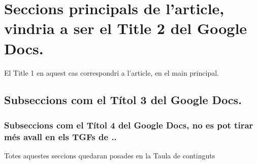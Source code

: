 \section{Seccions principals de l'article, vindria a ser el Title 2 del Google Docs.}
El Title 1 en aquest cas correspondri a l'article,  en el main principal.
\subsection{Subseccions com el Títol 3 del Google Docs.}
\subsubsection{Subseccions com el Títol 4 del Google Docs, no es pot tirar més avall en els TGFs de \upf..}
Totes aquestes seccions quedaran posades en la Taula de continguts \cite{autor} %
